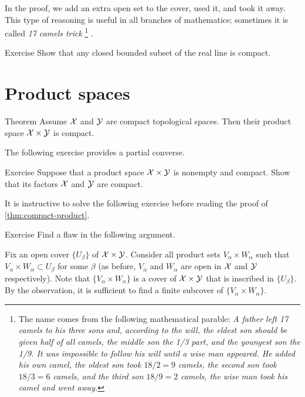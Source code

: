 In the proof, we add an extra open set to the cover, used it, and took it away.
This type of reasoning is useful in all branches of mathematics;
sometimes it is called \emph{17 camels trick}%
\footnote{The name comes from the following mathematical parable:
\textit{A father left 17 camels to his three sons and, according to the will,
the eldest son should be given half of all camels,
the middle son the 1/3 part,
and the youngest son the 1/9.
It was impossible to follow his will until a wise man appeared.
He added his own camel, the oldest son took $18/2=9$ camels, the second son took $18/3=6$ camels, and the third son $18/9=2$ camels, the wise man took his camel and went away.}}
\cite{17-camels}.

\begin{thm}{Exercise}\label{ex:closed-bounded=compact}
Show that any closed bounded subset of the real line is compact.
\end{thm}

 
\section{Product spaces}

\begin{thm}{Theorem}\label{thm:compact-product}
Assume $\mathcal{X}$ and $\mathcal{Y}$ are compact topological spaces.
Then their product space $\mathcal{X}\times\mathcal{Y}$ is compact.
\end{thm}

The following exercise provides a partial converse.

\begin{thm}{Exercise}\label{ex:compact-product}
Suppose that a product space $\mathcal{X}\times\mathcal{Y}$ is nonempty and compact.
Show that its factors $\mathcal{X}$ and $\mathcal{Y}$ are compact.
\end{thm} 

It is instructive to solve the following exercise before reading the proof of \ref{thm:compact-product}.

\begin{thm}{Exercise}\label{ex:fake-proof(thm:compact-product)}
Find a flaw in the following argument.
\end{thm}

Fix an open cover $\{U_\beta\}$ of $\mathcal{X}\times\mathcal{Y}$.
Consider all product sets $V_\alpha\times W_\alpha$ such that $V_\alpha\times W_\alpha\subset U_\beta$ for some $\beta$ (as before, $V_\alpha$ and $W_\alpha$ are open in $\mathcal{X}$ and $\mathcal{Y}$ respectively).
Note that $\{V_\alpha\times W_\alpha\}$ is a cover of $\mathcal{X}\times\mathcal{Y}$ that is inscribed in $\{U_\beta\}$.
By the observation, it is sufficient to find a finite subcover of $\{V_\alpha\times W_\alpha\}$.

